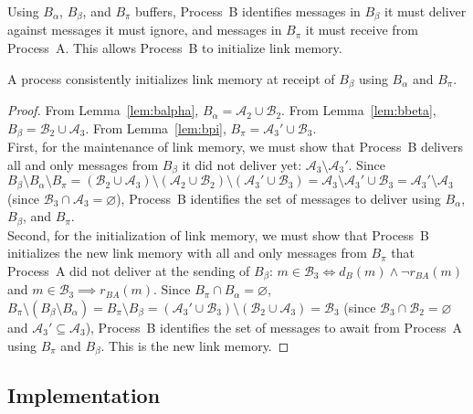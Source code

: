 \noindent Using $B_\alpha$, $B_\beta$, and $B_\pi$ buffers, Process~B identifies
messages in $B_\beta$ it must deliver against messages it must ignore, and
messages in $B_\pi$ it must receive from Process~A. This allows Process~B to
initialize link memory.

\begin{theorem}
  A process consistently initializes link memory at receipt of $B_\beta$ using
  $B_\alpha$ and $B_\pi$.
\end{theorem}

\begin{proof}
  From Lemma~\ref{lem:balpha}, $B_\alpha = \mathcal{A}_2 \cup \mathcal{B}_2$.
  From Lemma~\ref{lem:bbeta}, $B_\beta= \mathcal{B}_2 \cup \mathcal{A}_3$. From
  Lemma~\ref{lem:bpi}, $B_\pi = \mathcal{A}_3' \cup \mathcal{B}_3$. \\ First,
  for the maintenance of link memory, we must show that Process~B delivers all
  and only messages from $B_\beta$ it did not deliver yet:
  $\mathcal{A}_3 \setminus \mathcal{A}_3'$. Since
  $B_\beta \setminus B_\alpha \setminus B_\pi = (\mathcal{B}_2 \cup
  \mathcal{A}_3) \setminus (\mathcal{A}_2 \cup \mathcal{B}_2) \setminus
  (\mathcal{A}_3' \cup \mathcal{B}_3) = \mathcal{A}_3 \setminus \mathcal{A}_3'
  \cup \mathcal{B}_3 = \mathcal{A}_3'\setminus \mathcal{A}_3$
  (since $\mathcal{B}_3 \cap \mathcal{A}_3 = \varnothing$), Process~B identifies
  the set of messages to deliver using $B_\alpha$, $B_\beta$, and $B_\pi$. \\
  Second, for the initialization of link memory, we must show that Process~B
  initializes the new link memory with all and only messages from $B_\pi$ that
  Process~A did not deliver at the sending of $B_\beta$:
  $m \in \mathcal{B}_3 \Leftrightarrow d_B(m) \wedge \neg r_{BA}(m)$ and
  $m \in \mathcal{B}_3 \implies r_{BA}(m)$.  Since
  $B_\pi \cap B_\alpha = \varnothing$,
  $B_\pi \setminus (B_\beta \setminus B_\alpha)= B_\pi \setminus B_\beta =
  (\mathcal{A}_3' \cup \mathcal{B}_3) \setminus (\mathcal{B}_2 \cup
  \mathcal{A}_3) = \mathcal{B}_3$
  (since $\mathcal{B}_3 \cap \mathcal{B}_2 = \varnothing$ and
  $\mathcal{A}_3' \subseteq \mathcal{A}_3$), Process~B identifies the set of
  messages to await from Process~A using $B_\pi$ and $B_\beta$. This is the new
  link memory.
\end{proof}

\subsection{Implementation}

